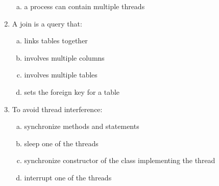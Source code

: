 \documentclass[10pt,a4paper,twocolumn]{article}
\begin{document}
\begin{enumerate}
\begin{enumerate}[(a)]
	\item a process can contain multiple threads
\end{enumerate}
\item A join is a query that:
\begin{enumerate}[(a)]
	\item links tables together
	\item involves multiple columns
	\item involves multiple tables
	\item sets the foreign key for a table
\end{enumerate}
\item To avoid thread interference:
\begin{enumerate}[(a)]
	\item synchronize methods and statements
	\item sleep one of the threads
	\item synchronize constructor of the class implementing the thread
	\item interrupt one of the threads
\end{enumerate}
\end{enumerate}
\clearpage
\end{document}
